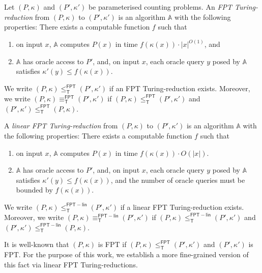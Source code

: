 \documentclass[authorcolumns,numberwithinsect]{no-lipics-v2022}
\newcommand{\fptred}{\leq^{\mathsf{FPT}}_{\mathsf{T}}}
\newcommand{\fptinterred}{\equiv^{\mathsf{FPT}}_{\mathsf{T}}}
\newcommand{\fptlinred}{\leq^{\mathsf{FPT-lin}}_{\mathsf{T}}}
\newcommand{\fptinterlinred}{\equiv^{\mathsf{FPT-lin}}_{\mathsf{T}}}
\begin{document}
\begin{definition}
    Let $(P,\kappa)$ and $(P',\kappa')$ be parameterised counting problems. An \emph{FPT Turing-reduction} from $(P,\kappa)$ to $(P',\kappa')$ is an algorithm $\mathbb{A}$ with the following properties: There exists a computable function $f$ such that
    \begin{enumerate}
        \item on input $x$, $\mathbb{A}$ computes $P(x)$ in time $f(\kappa(x))\cdot |x|^{O(1)}$, and
        \item $\mathbb{A}$ has oracle access to $P'$, and, on input $x$, each oracle query $y$ posed by $\mathbb{A}$ satisfies $\kappa'(y)\leq f(\kappa(x))$.
    \end{enumerate}
    We write $(P,\kappa)\fptred (P',\kappa')$ if an FPT Turing-reduction exists. Moreover, we write $(P,\kappa)\fptinterred (P',\kappa')$ if $(P,\kappa)\fptred (P',\kappa')$ and $(P',\kappa')\fptred (P,\kappa)$.

    A \emph{linear FPT Turing-reduction} from $(P,\kappa)$ to $(P',\kappa')$ is an algorithm $\mathbb{A}$ with the following properties: There exists a computable function $f$ such that
    \begin{enumerate}
        \item on input $x$, $\mathbb{A}$ computes $P(x)$ in time $f(\kappa(x))\cdot O(|x|)$.
        \item $\mathbb{A}$ has oracle access to $P'$, and, on input $x$, each oracle query $y$ posed by $\mathbb{A}$ satisfies $\kappa'(y)\leq f(\kappa(x))$, and the number of oracle queries must be bounded by $f(\kappa(x))$.
    \end{enumerate}
    We write $(P,\kappa)\fptlinred (P',\kappa')$ if a linear FPT Turing-reduction exists. Moreover, we write $(P,\kappa)\fptinterlinred (P',\kappa')$ if $(P,\kappa)\fptlinred (P',\kappa')$ and $(P',\kappa')\fptlinred (P,\kappa)$.
\end{definition}

It is well-known that $(P,\kappa)$ is FPT if $(P,\kappa)\fptred (P',\kappa')$ and $(P',\kappa')$ is FPT. For the purpose of this work, we establish a more fine-grained version of this fact via linear FPT Turing-reductions.
\end{document}
